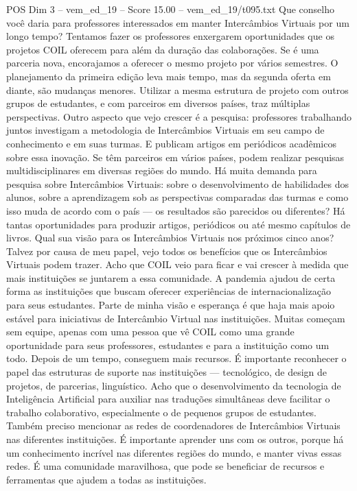 \begin{textsample}{POS Dim 3 – vem\_ed\_19 – Score 15.00 – vem\_ed\_19/t095.txt}
Que conselho você daria para professores interessados em manter Intercâmbios Virtuais por um longo tempo?
Tentamos fazer os professores enxergarem oportunidades que os projetos COIL oferecem para além da duração das colaborações.
Se é uma parceria nova, encorajamos a oferecer o mesmo projeto por vários semestres.
O planejamento da primeira edição leva mais tempo, mas da segunda oferta em diante, são mudanças menores.
Utilizar a mesma estrutura de projeto com outros grupos de estudantes, e com parceiros em diversos países, traz múltiplas perspectivas.
Outro aspecto que vejo crescer é a pesquisa: professores trabalhando juntos investigam a metodologia de Intercâmbios Virtuais em seu campo de conhecimento e em suas turmas.
E publicam artigos em periódicos acadêmicos sobre essa inovação.
Se têm parceiros em vários países, podem realizar pesquisas multidisciplinares em diversas regiões do mundo.
Há muita demanda para pesquisa sobre Intercâmbios Virtuais: sobre o desenvolvimento de habilidades dos alunos, sobre a aprendizagem sob as perspectivas comparadas das turmas e como isso muda de acordo com o país — os resultados são parecidos ou diferentes?
Há tantas oportunidades para produzir artigos, periódicos ou até mesmo capítulos de livros.
Qual sua visão para os Intercâmbios Virtuais nos próximos cinco anos?
Talvez por causa de meu papel, vejo todos os benefícios que os Intercâmbios Virtuais podem trazer.
Acho que COIL veio para ficar e vai crescer à medida que mais instituições se juntarem a essa comunidade.
A pandemia ajudou de certa forma as instituições que buscam oferecer experiências de internacionalização para seus estudantes.
Parte de minha visão e esperança é que haja mais apoio estável para iniciativas de Intercâmbio Virtual nas instituições.
Muitas começam sem equipe, apenas com uma pessoa que vê COIL como uma grande oportunidade para seus professores, estudantes e para a instituição como um todo.
Depois de um tempo, conseguem mais recursos.
É importante reconhecer o papel das estruturas de suporte nas instituições — tecnológico, de design de projetos, de parcerias, linguístico.
Acho que o desenvolvimento da tecnologia de Inteligência Artificial para auxiliar nas traduções simultâneas deve facilitar o trabalho colaborativo, especialmente o de pequenos grupos de estudantes.
Também preciso mencionar as redes de coordenadores de Intercâmbios Virtuais nas diferentes instituições.
É importante aprender uns com os outros, porque há um conhecimento incrível nas diferentes regiões do mundo, e manter vivas essas redes.
É uma comunidade maravilhosa, que pode se beneficiar de recursos e ferramentas que ajudem a todas as instituições.

\end{textsample}
